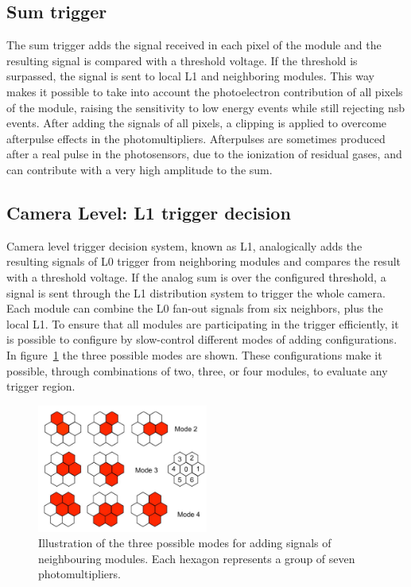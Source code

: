 \documentclass[main.tex]{subfiles}
\begin{document}
\subsection{Sum trigger}

The sum trigger adds the signal received in each pixel of the module and the resulting signal is compared with a threshold voltage. If
the threshold is surpassed, the signal is sent to local L1 and neighboring modules. This way makes it possible to take into account the photoelectron contribution of all pixels of the module, raising the sensitivity to low energy events while still rejecting \gls{nsb} events. After adding the signals of all pixels, a clipping is applied to overcome afterpulse effects in the photomultipliers. Afterpulses are sometimes produced after a real pulse in the photosensors, due to the ionization of residual gases, and can contribute with a very high amplitude to the sum.

\subsection{Camera Level: L1 trigger decision}

Camera level trigger decision system, known as  L1, analogically adds the resulting signals of L0 trigger from neighboring modules and compares
the result with a threshold voltage. If the analog sum is over the configured threshold, a signal is sent through the L1 distribution system to trigger the whole camera.
Each module can combine the L0 fan-out signals from six neighbors, plus the local L1. To ensure that all modules are participating in the trigger efficiently, it is possible to configure by slow-control different modes of adding configurations. In figure~\ref{fig:trigmodes} the three possible modes are shown. These configurations make it possible, through combinations of two, three, or four modules, to evaluate any trigger region.

\begin{figure}[h]
  \centering
  \includegraphics[width=0.5\textwidth]{./Pictures/triggermodes.pdf}
  \caption{Illustration of the three possible modes for adding signals of neighbouring modules. Each hexagon represents a group of seven photomultipliers.}
  \label{fig:trigmodes}
\end{figure}
\end{document}
